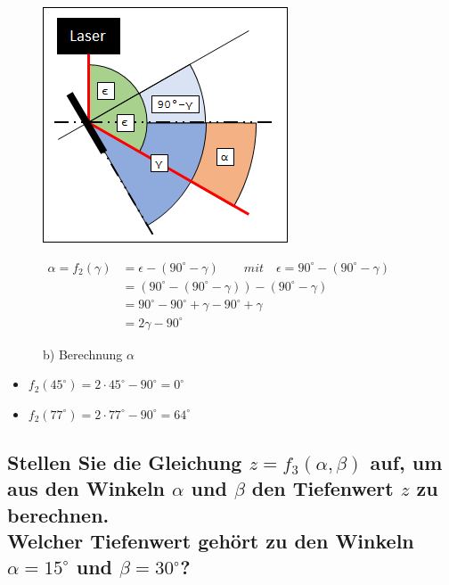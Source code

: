 \documentclass[a4paper,10pt,DIV=14]{scrartcl}
\newcommand{\dg}[1]{#1^\circ}
\begin{document}
\begin{figure}[H]
	\begin{minipage}[c]{0.49\textwidth}
		\centering						
		\includegraphics[width=.95\linewidth]{alpha.png}
	\end{minipage}
	\hfill
	\begin{minipage}[c]{0.49\textwidth}
		\centering
		$ \begin{aligned}
			\alpha = f_2(\gamma) & = \epsilon - (\dg{90} - \gamma) \qquad \textit{mit} \quad \epsilon = \dg{90} - (\dg{90} - \gamma) \\
			       & = (\dg{90} - (\dg{90} - \gamma)) - (\dg{90} - \gamma) \\
		           & = \dg{90} - \dg{90} + \gamma - \dg{90} + \gamma \\
		           & = 2\gamma - \dg{90}
		\end{aligned} $
	\end{minipage}
	\caption*{b) Berechnung $\alpha$}
\end{figure}

\begin{itemize}[itemsep=0pt]
	\item $f_2(\dg{45}) = 2 \cdot \dg{45} - \dg{90} =  \dg{0}$
	\item $f_2(\dg{77}) = 2 \cdot \dg{77} - \dg{90} =  \dg{64}$
\end{itemize}


\subsection{Stellen Sie die Gleichung $z = f_3(\alpha, \beta)$ auf, um aus den Winkeln $\alpha$ und $\beta$ den Tiefenwert $z$ zu berechnen. \\ Welcher Tiefenwert gehört zu den Winkeln $\alpha = 15^\circ$ und $\beta = 30^\circ$?}
\end{document}
